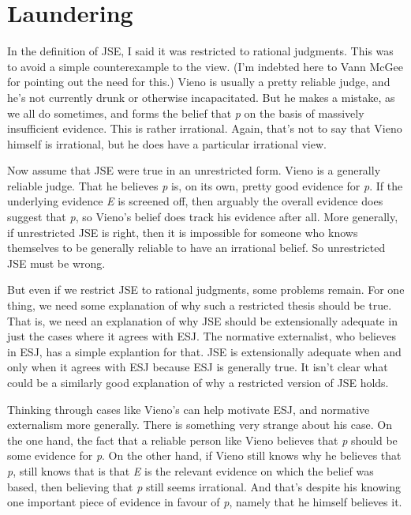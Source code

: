 \documentclass[
  10pt,
  letterpaper,
  twoside]{scrbook}
\begin{document}
\section{Laundering}\label{laundering}

In the definition of JSE, I said it was restricted to rational
judgments. This was to avoid a simple counterexample to the view. (I'm
indebted here to Vann McGee for pointing out the need for this.) {Vieno}
is usually a pretty reliable judge, and he's not currently drunk or
otherwise incapacitated. But he makes a mistake, as we all do sometimes,
and forms the belief that \emph{p} on the basis of massively
insufficient evidence. This is rather irrational. Again, that's not to
say that {Vieno} himself is irrational, but he does have a particular
irrational view.

Now assume that JSE were true in an unrestricted form. {Vieno} is a
generally reliable judge. That he believes \emph{p} is, on its own,
pretty good evidence for \emph{p}. If the underlying evidence \emph{E}
is screened off, then arguably the overall evidence does suggest that
\emph{p}, so {Vieno}'s belief does track his evidence after all. More
generally, if unrestricted JSE is right, then it is impossible for
someone who knows themselves to be generally reliable to have an
irrational belief. So unrestricted JSE must be wrong.

But even if we restrict JSE to rational judgments, some problems remain.
For one thing, we need some explanation of why such a restricted thesis
should be true. That is, we need an explanation of why JSE should be
extensionally adequate in just the cases where it agrees with ESJ. The
normative externalist, who believes in ESJ, has a simple explantion for
that. JSE is extensionally adequate when and only when it agrees with
ESJ because ESJ is generally true. It isn't clear what could be a
similarly good explanation of why a restricted version of JSE holds.

Thinking through cases like {Vieno}'s can help motivate ESJ, and
normative externalism more generally. There is something very strange
about his case. On the one hand, the fact that a reliable person like
{Vieno} believes that \emph{p} should be some evidence for \emph{p}. On
the other hand, if {Vieno} still knows why he believes that \emph{p},
still knows that is that \emph{E} is the relevant evidence on which the
belief was based, then believing that \emph{p} still seems irrational.
And that's despite his knowing one important piece of evidence in favour
of \emph{p}, namely that he himself believes it.
\end{document}
